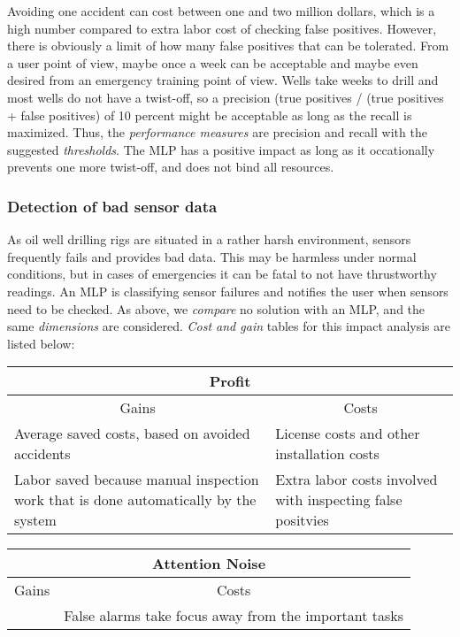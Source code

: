 \documentclass{article}
\theoremstyle{theorem}
\theoremstyle{definition}
\begin{document}
Avoiding one accident can cost between one and two million dollars, which is a high number compared to extra labor cost of checking false positives. 
However, there is obviously a limit of how many false positives that can be tolerated. 
From a user point of view, maybe once a week can be acceptable and maybe even desired from an emergency training point of view. 
Wells take weeks to drill and most wells do not have a twist-off, so a precision (true positives / (true positives + false positives) of 10 percent might be acceptable as long as the recall is maximized. 
Thus, the \emph{performance measures} are precision and recall with the suggested \emph{thresholds}.
The MLP has a positive impact as long as it occationally prevents one more twist-off, and does not bind all resources.

\subsubsection{Detection of bad sensor data}
As oil well drilling rigs are situated in a rather harsh environment, sensors frequently fails and provides bad data. 
This may be harmless under normal conditions, but in cases of emergencies it can be fatal to not have thrustworthy readings. 
An MLP is classifying sensor failures and notifies the user when sensors need to be checked. 
As above, we \emph{compare} no solution with an MLP, and the same \emph{dimensions} are considered.
\emph{Cost and gain} tables for this impact analysis are listed below:

\vspace{1ex}
\begin{tabular}{|p{}|p{}|}
\hline
\multicolumn{2}{|c|}{Profit}\\
\hline
\multicolumn{1}{|c|}{Gains} & 
\multicolumn{1}{|c|}{Costs} \\
\hline
Average saved costs, based on avoided accidents &
License costs and other installation costs \\ 
\hline
Labor saved because manual inspection work that is done automatically by the system &
Extra labor costs involved with inspecting false positvies \\ 
\hline
\end{tabular}
\vspace{1ex}

\vspace{1ex}
\begin{tabular}{|p{}|p{}|}
\hline
\multicolumn{2}{|c|}{Attention Noise}\\
\hline
\multicolumn{1}{|c|}{Gains} & 
\multicolumn{1}{|c|}{Costs} \\
\hline
& False alarms take focus away from the important tasks \\ 
\hline
\end{tabular}
\vspace{1ex}
\end{document}
